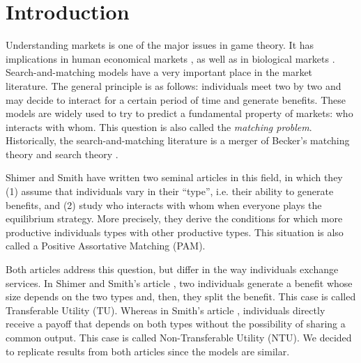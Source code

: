 \section*{Introduction}

Understanding markets is one of the major issues in game theory. It has implications in human economical markets \citep{osborne_bargaining_1990,chade_sorting_2017}, as well as in biological markets \citep{noe_biological_1995,hammerstein_biological_2016,fruteau_supply_2009,baumard_mutualistic_2013}. Search-and-matching models have a very important place in the market literature. The general principle is as follows: individuals meet two by two and may decide to interact for a certain period of time and generate benefits. These models are widely used to try to predict a fundamental property of markets: who interacts with whom. This question is also called the \textit{matching problem}. Historically, the search-and-matching literature is a merger of Becker's matching theory \citep{becker_theory_1973} and search theory \citep{stigler_economics_1961,rogerson_search-theoretic_2005}.

Shimer and Smith have written two seminal articles \citep{shimer_assortative_2000,smith_marriage_2006} in this field, in which they (1) assume that individuals vary in their ``type'', i.e. their ability to generate benefits, and (2) study who interacts with whom when everyone plays the equilibrium strategy. More precisely, they derive the conditions for which more productive individuals types with other productive types. This situation is also called a Positive Assortative Matching (PAM).

Both articles address this question, but differ in the way individuals exchange services. In Shimer and Smith's article \citep{shimer_assortative_2000}, two individuals generate a benefit whose size depends on the two types and, then, they split the benefit. This case is called Transferable Utility (TU). Whereas in Smith's article \citep{smith_marriage_2006}, individuals directly receive a payoff that depends on both types without the possibility of sharing a common output. This case is called Non-Transferable Utility (NTU). We decided to replicate results from both articles since the models are similar.


